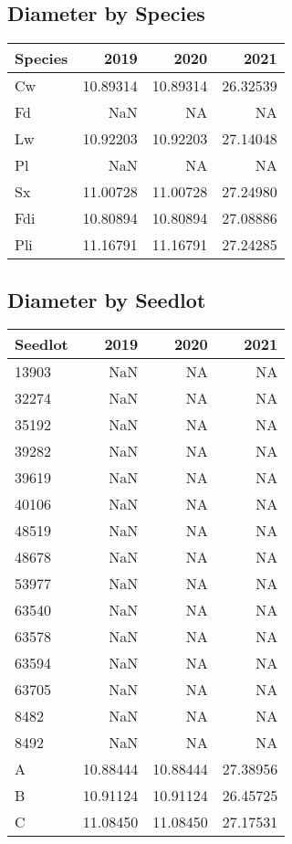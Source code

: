 \documentclass[
]{article}
\begin{document}
\hypertarget{diameter-by-species-1}{%
\subsection{Diameter by Species}\label{diameter-by-species-1}}

\begin{tabular}{l|r|r|r}
\hline
Species & 2019 & 2020 & 2021\\
\hline
Cw & 10.89314 & 10.89314 & 26.32539\\
\hline
Fd & NaN & NA & NA\\
\hline
Lw & 10.92203 & 10.92203 & 27.14048\\
\hline
Pl & NaN & NA & NA\\
\hline
Sx & 11.00728 & 11.00728 & 27.24980\\
\hline
Fdi & 10.80894 & 10.80894 & 27.08886\\
\hline
Pli & 11.16791 & 11.16791 & 27.24285\\
\hline
\end{tabular}

\hypertarget{diameter-by-seedlot-1}{%
\subsection{Diameter by Seedlot}\label{diameter-by-seedlot-1}}

\begin{tabular}{l|r|r|r}
\hline
Seedlot & 2019 & 2020 & 2021\\
\hline
13903 & NaN & NA & NA\\
\hline
32274 & NaN & NA & NA\\
\hline
35192 & NaN & NA & NA\\
\hline
39282 & NaN & NA & NA\\
\hline
39619 & NaN & NA & NA\\
\hline
40106 & NaN & NA & NA\\
\hline
48519 & NaN & NA & NA\\
\hline
48678 & NaN & NA & NA\\
\hline
53977 & NaN & NA & NA\\
\hline
63540 & NaN & NA & NA\\
\hline
63578 & NaN & NA & NA\\
\hline
63594 & NaN & NA & NA\\
\hline
63705 & NaN & NA & NA\\
\hline
8482 & NaN & NA & NA\\
\hline
8492 & NaN & NA & NA\\
\hline
A & 10.88444 & 10.88444 & 27.38956\\
\hline
B & 10.91124 & 10.91124 & 26.45725\\
\hline
C & 11.08450 & 11.08450 & 27.17531\\
\hline
\end{tabular}
\end{document}
